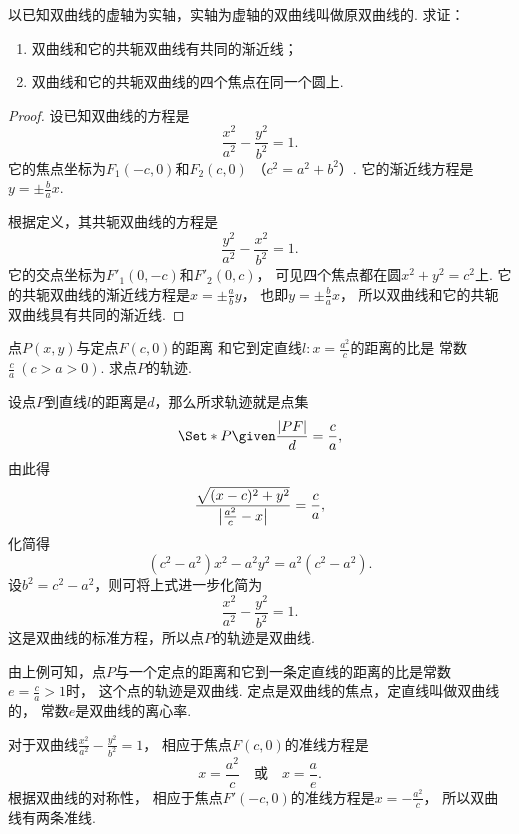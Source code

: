 \begin{example}
以已知双曲线的虚轴为实轴，实轴为虚轴的双曲线叫做原双曲线的.
求证：\begin{enumerate}
	\item 双曲线和它的共轭双曲线有共同的渐近线；
	\item 双曲线和它的共轭双曲线的四个焦点在同一个圆上.
\end{enumerate}
\begin{proof}
设已知双曲线的方程是\begin{equation*}
	\frac{x^2}{a^2}-\frac{y^2}{b^2}=1.
\end{equation*}
它的焦点坐标为\(F_1(-c,0)\)和\(F_2(c,0)\)
（\(c^2=a^2+b^2\)）.
它的渐近线方程是\(y=\pm\frac{b}{a}x\).

根据定义，其共轭双曲线的方程是\begin{equation*}
	\frac{y^2}{a^2}-\frac{x^2}{b^2}=1.
\end{equation*}
它的交点坐标为\(F'_1(0,-c)\)和\(F'_2(0,c)\)，
可见四个焦点都在圆\(x^2+y^2=c^2\)上.
它的共轭双曲线的渐近线方程是\(x=\pm\frac{a}{b}y\)，
也即\(y=\pm\frac{b}{a}x\)，
所以双曲线和它的共轭双曲线具有共同的渐近线.
\end{proof}
\end{example}

\begin{example}
点\(P(x,y)\)与定点\(F(c,0)\)的距离
和它到定直线\(l: x = \frac{a^2}{c}\)的距离的比是
常数\(\frac{c}{a}\ (c > a > 0)\).
求点\(P\)的轨迹.
\begin{solution}
设点\(P\)到直线\(l\)的距离是\(d\)，那么所求轨迹就是点集\begin{equation*}
	\Set*{ P \given \frac{\LineSegmentLength{PF}}{d} = \frac{c}{a} },
\end{equation*}
由此得\begin{equation*}
	\frac{\sqrt{(x-c)^2+y^2}}{\abs{\frac{a^2}{c}-x}} = \frac{c}{a},
\end{equation*}
化简得\begin{equation*}
	(c^2-a^2)x^2 - a^2 y^2 = a^2(c^2-a^2).
\end{equation*}
设\(b^2=c^2-a^2\)，则可将上式进一步化简为\begin{equation*}
	\frac{x^2}{a^2}-\frac{y^2}{b^2}=1.
\end{equation*}
这是双曲线的标准方程，所以点\(P\)的轨迹是双曲线.
\end{solution}
\begin{remark}
由上例可知，点\(P\)与一个定点的距离和它到一条定直线的距离的比是常数
\(e = \frac{c}{a} > 1\)时，
这个点的轨迹是双曲线.
定点是双曲线的焦点，定直线叫做双曲线的，
常数\(e\)是双曲线的离心率.
\end{remark}

对于双曲线\(\frac{x^2}{a^2}-\frac{y^2}{b^2}=1\)，
相应于焦点\(F(c,0)\)的准线方程是\begin{equation*}
	x = \frac{a^2}{c}
	\quad\text{或}\quad
	x = \frac{a}{e}.
\end{equation*}
根据双曲线的对称性，
相应于焦点\(F'(-c,0)\)的准线方程是\(x=-\frac{a^2}{c}\)，
所以双曲线有两条准线.
\end{example}

